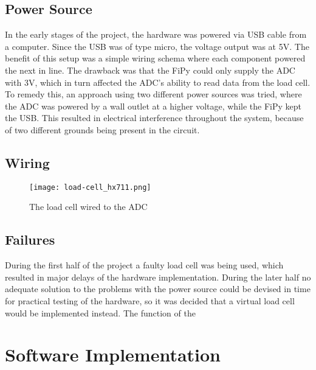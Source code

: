 \subsection{Power Source}
In the early stages of the project, the hardware was powered via USB cable from a computer. Since the USB was of type micro, the voltage output was at 5V. The benefit of this setup was a simple wiring schema where each component powered the next in line. The drawback was that the FiPy could only supply the ADC with 3V, which in turn affected the ADC's ability to read data from the load cell. To remedy this, an approach using two different power sources was tried, where the ADC was powered by a wall outlet at a higher voltage, while the FiPy kept the USB. This resulted in electrical interference throughout the system, because of two different grounds being present in the circuit.

\subsection{Wiring}
\begin{figure}[h]
	\centering
	\texttt{[image: load-cell\_hx711.png]}
	\caption{The load cell wired to the ADC}
	\label{fig:load-cell_hx711}
\end{figure}

\subsection{Failures}
During the first half of the project a faulty load cell was being used, which resulted in major delays of the hardware implementation. During the later half no adequate solution to the problems with the power source could be devised in time for practical testing of the hardware, so it was decided that a virtual load cell would be implemented instead. The function of the 






\section{Software Implementation}

\subsection{}


